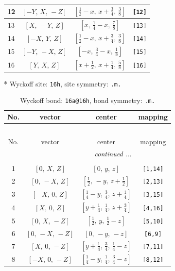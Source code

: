 \documentclass[fleqn,8pt]{jsarticle}
\begin{document}
\begin{longtable}{cccc}
12 & $\left[ - Y,\, X,\, - Z \right]$ & $\left[ \frac{1}{2} - x,\, x + \frac{3}{4},\, \frac{3}{8} \right]$ & {\tt [12]} \\ \hline
13 & $\left[ X,\, - Y,\, Z \right]$ & $\left[ x,\, \frac{1}{4} - x,\, \frac{7}{8} \right]$ & {\tt [13]} \\ \hline
14 & $\left[ - X,\, Y,\, Z \right]$ & $\left[ \frac{1}{2} - x,\, x + \frac{3}{4},\, \frac{3}{8} \right]$ & {\tt [14]} \\ \hline
15 & $\left[ - Y,\, - X,\, Z \right]$ & $\left[ - x,\, \frac{3}{4} - x,\, \frac{1}{8} \right]$ & {\tt [15]} \\ \hline
16 & $\left[ Y,\, X,\, Z \right]$ & $\left[ x + \frac{1}{2},\, x + \frac{1}{4},\, \frac{5}{8} \right]$ & {\tt [16]} \\
\end{longtable}
* Wyckoff site: {\tt 16h}, site symmetry: {\tt .m.}
\renewcommand{\arraystretch}{1.2}
\begin{longtable}{cccc}
\caption{Wyckoff bond: {\tt 16a@16h}, bond symmetry: {\tt .m.}}
 \\
 \hline \hline
No. & vector & center & mapping \\ \hline \endfirsthead

\multicolumn{3}{l}{\tablename\ \thetable{}} \\
 \hline \hline
No. & vector & center & mapping \\ \hline \endhead

 \hline \hline
\multicolumn{3}{r}{\footnotesize\it continued ...} \\ \endfoot

 \hline \hline
\multicolumn{3}{r}{} \\ \endlastfoot

1 & $\left[ 0,\, X,\, Z \right]$ & $\left[ 0,\, y,\, z \right]$ & {\tt [1,14]} \\ \hline
2 & $\left[ 0,\, - X,\, Z \right]$ & $\left[ \frac{1}{2},\, - y,\, z + \frac{1}{2} \right]$ & {\tt [2,13]} \\ \hline
3 & $\left[ - X,\, 0,\, Z \right]$ & $\left[ \frac{1}{4} - y,\, \frac{3}{4},\, z + \frac{1}{4} \right]$ & {\tt [3,15]} \\ \hline
4 & $\left[ X,\, 0,\, Z \right]$ & $\left[ y + \frac{1}{4},\, \frac{1}{4},\, z + \frac{3}{4} \right]$ & {\tt [4,16]} \\ \hline
5 & $\left[ 0,\, X,\, - Z \right]$ & $\left[ \frac{1}{2},\, y,\, \frac{1}{2} - z \right]$ & {\tt [5,10]} \\ \hline
6 & $\left[ 0,\, - X,\, - Z \right]$ & $\left[ 0,\, - y,\, - z \right]$ & {\tt [6,9]} \\ \hline
7 & $\left[ X,\, 0,\, - Z \right]$ & $\left[ y + \frac{1}{4},\, \frac{3}{4},\, \frac{1}{4} - z \right]$ & {\tt [7,11]} \\ \hline
8 & $\left[ - X,\, 0,\, - Z \right]$ & $\left[ \frac{1}{4} - y,\, \frac{1}{4},\, \frac{3}{4} - z \right]$ & {\tt [8,12]} \\
\end{longtable}
\end{document}
